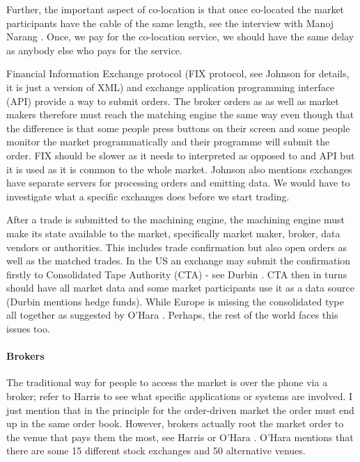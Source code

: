 \documentclass[12pt]{article}
\begin{document}
Further, the important aspect of co-location is that once co-located the market participants have the cable  of the same length, see the interview with Manoj Narang \cite{reuters}. Once, we pay for the co-location service, we should have the same delay as anybody else who pays for the service.

Financial Information Exchange protocol (FIX protocol, see Johnson \cite{johnson} for details, it is just a version of XML) and exchange application programming interface (API) provide a way to submit orders. The broker orders as as well as market makers therefore must reach the matching engine the same way even though that the difference is that some people press buttons on their screen and some people monitor the market programmatically and their programme will submit the order. FIX should be slower as it needs to interpreted as opposed to and API but it is used as it is common to the whole market. Johnson \cite{johnson} also mentions exchanges have separate servers for processing orders and emitting data. We would have to investigate what a specific exchanges does before we start trading.

After a trade is submitted to the machining engine, the machining engine must make its state available to the market, specifically market maker, broker, data vendors or authorities. This includes trade confirmation but also open orders as well as the matched trades. In the US an exchange may submit the confirmation firstly to Consolidated Tape Authority (CTA) - see Durbin \cite{durbin}. CTA then in turns should have all market data and some market participants use it as a data source (Durbin \cite{durbin} mentions hedge funds). While Europe is missing the consolidated type all together as suggested by O'Hara \cite{ohara}. Perhaps, the rest of the world faces this issues too.

\paragraph*{Brokers} The traditional way for people to access the market is over the phone via a broker; refer to Harris \cite{harris} to see what specific applications or systems are involved. I just mention that in the principle for the order-driven market the order must end up in the same order book. However, brokers actually root the market order to the venue that pays them the most, see Harris \cite{harris} or O'Hara \cite{ohara}. O'Hara mentions that there are some 15 different stock exchanges and 50 alternative venues.
\end{document}
